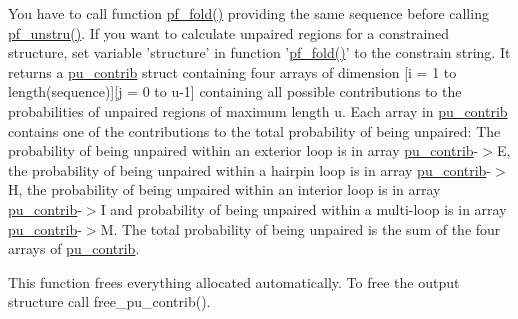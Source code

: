 You have to call function \hyperlink{group__pf__fold_gadc3db3d98742427e7001a7fd36ef28c2}{pf\+\_\+fold()} providing the same sequence before calling \hyperlink{group__up__cofold_ga5b4ee40e190d2f633cd01cf0d2fe93cf}{pf\+\_\+unstru()}. If you want to calculate unpaired regions for a constrained structure, set variable 'structure' in function '\hyperlink{group__pf__fold_gadc3db3d98742427e7001a7fd36ef28c2}{pf\+\_\+fold()}' to the constrain string. It returns a \hyperlink{group__data__structures_structpu__contrib}{pu\+\_\+contrib} struct containing four arrays of dimension \mbox{[}i = 1 to length(sequence)\mbox{]}\mbox{[}j = 0 to u-\/1\mbox{]} containing all possible contributions to the probabilities of unpaired regions of maximum length u. Each array in \hyperlink{group__data__structures_structpu__contrib}{pu\+\_\+contrib} contains one of the contributions to the total probability of being unpaired\+: The probability of being unpaired within an exterior loop is in array \hyperlink{group__data__structures_structpu__contrib}{pu\+\_\+contrib}-\/$>$E, the probability of being unpaired within a hairpin loop is in array \hyperlink{group__data__structures_structpu__contrib}{pu\+\_\+contrib}-\/$>$H, the probability of being unpaired within an interior loop is in array \hyperlink{group__data__structures_structpu__contrib}{pu\+\_\+contrib}-\/$>$I and probability of being unpaired within a multi-\/loop is in array \hyperlink{group__data__structures_structpu__contrib}{pu\+\_\+contrib}-\/$>$M. The total probability of being unpaired is the sum of the four arrays of \hyperlink{group__data__structures_structpu__contrib}{pu\+\_\+contrib}.

This function frees everything allocated automatically. To free the output structure call free\+\_\+pu\+\_\+contrib().


